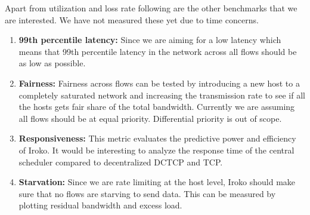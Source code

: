Apart from utilization and loss rate following are the other benchmarks that we
are interested. We have not measured these yet due to time concerns.

\begin{enumerate}

\item \textbf{99th percentile latency:} Since we are aiming for a low latency
which means that 99th percentile latency in the network across all flows should
be as low as possible.

\item \textbf{Fairness:} Fairness across flows can be tested by introducing a
new host to a completely saturated network and increasing the transmission rate
to see if all the hosts gets fair share of the total bandwidth. Currently we are
assuming all flows should be at equal priority. Differential priority is out of
scope.

\item \textbf{Responsiveness:} This metric evaluates the predictive power and
efficiency of Iroko. It would be interesting to analyze the response time of the
central scheduler compared to decentralized DCTCP and TCP.

\item \textbf{Starvation:} Since we are rate limiting at the host level, Iroko
should make sure that no flows are starving to send data. This can be measured
by plotting residual bandwidth and excess load.

\end{enumerate}
